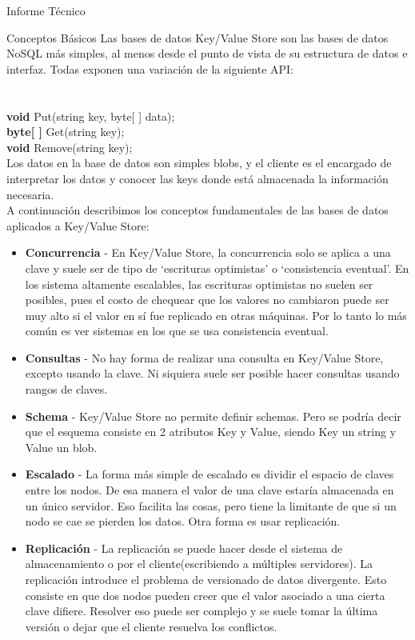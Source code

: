 \begin{section}{Informe T\'ecnico}
\begin{subsection}{Conceptos Básicos}
Las bases de datos Key/Value Store son las bases de datos NoSQL más simples, al menos desde el punto de vista de su estructura de datos e interfaz. Todas exponen una variación de la siguiente API:\\ \\
\\
\textbf{void} Put(string key, byte[ ] data);\\
\textbf{byte[ ]} Get(string key);\\
\textbf{void} Remove(string key);\\ 

Los datos en la base de datos son simples blobs, y el cliente es el encargado de interpretar los datos y conocer las keys donde está almacenada la información necesaria.\\

A continuación describimos los conceptos fundamentales de las bases de datos aplicados a Key/Value Store:

\begin{itemize}

\item \textbf{Concurrencia} -  En Key/Value Store, la concurrencia solo se aplica a una clave y suele ser de tipo de ‘escrituras optimistas’ o ‘consistencia eventual’. En los sistema altamente escalables, las escrituras optimistas no suelen ser posibles, pues el costo de chequear que los valores no cambiaron puede ser muy alto si el valor en sí fue replicado en otras máquinas. Por lo tanto lo más común es ver sistemas en los que se usa consistencia eventual.

\item \textbf{Consultas} - No hay forma de realizar una consulta en Key/Value Store, excepto usando la clave. Ni siquiera suele ser posible hacer consultas usando rangos de claves.

\item \textbf{Schema} -  Key/Value Store no permite definir schemas. Pero se podría decir que el esquema consiste en 2 atributos Key y Value, siendo Key un string y Value un blob. 
	
\item \textbf{Escalado} - La forma más simple de escalado es dividir el espacio de claves entre los nodos. De esa manera el valor de una clave estaría almacenada en un único servidor. Eso facilita las cosas, pero tiene la limitante de que si un nodo se cae se pierden los datos. Otra forma es usar replicación.
	
\item \textbf{Replicación} -  La replicación se puede hacer desde el sistema de almacenamiento o por el cliente(escribiendo a múltiples servidores). La replicación introduce el problema de versionado de datos divergente. Esto consiste en que dos nodos pueden creer que el valor asociado a una cierta clave difiere. Resolver eso puede ser complejo y se suele tomar la última versión o dejar que el cliente resuelva los conflictos.
	

\end{itemize}
\end{subsection}
\end{section}
